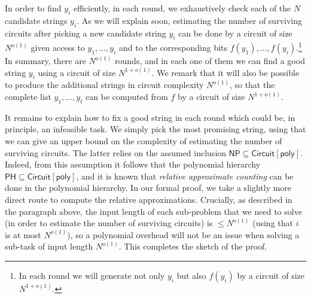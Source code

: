 \documentclass[11pt]{article}
\numberwithin{equation}{section}
\theoremstyle{definition}
\theoremstyle{plain}
\begin{document}
In order to find $y_i$ efficiently, in each round, we exhaustively check each of the $N$ candidate strings $y_i$. As we will explain soon, estimating the number of surviving circuits after picking a new candidate string $y_i$ can be done by a circuit of size $N^{o(1)}$ given access to $y_1, \ldots, y_i$ and to the corresponding bits $f(y_1), \ldots, f(y_i)$.\footnote{ 
In each round we will generate not only $y_i$ but also $f(y_i)$ by a circuit of size $N^{1+o(1)}$.
} In summary, there are $N^{o(1)}$ rounds, and in each one of them we can find a good string $y_i$ using a circuit of size $N^{1 + o(1)}$. We remark that it will also be possible to produce the additional strings in circuit complexity $N^{o(1)}$, so that the complete list $y_1, \ldots, y_t$ can be computed from $f$ by a circuit of size $N^{1 + o(1)}$. 

It remains to explain how to fix a good string in each round which could be, in principle, an infeasible task. We simply pick the most promising string, using that we can %
give an upper bound on %
the complexity of estimating the number of surviving circuits. The latter relies on the assumed inclusion $\mathsf{NP} \subseteq \mathsf{Circuit}[\mathsf{poly}]$. Indeed, from this assumption it follows that the polynomial hierarchy $\mathsf{PH} \subseteq \mathsf{Circuit}[\mathsf{poly}]$, and it is known that \emph{relative approximate counting} can be done in the polynomial hierarchy. In our formal proof, we take a slightly more direct route to compute the relative approximations. Crucially, as described in the paragraph above, the input length of each sub-problem that we need to solve (in order to estimate the number of surviving circuits) is $\leq N^{o(1)}$ (using that $i$ is at most $N^{o(1)}$), so a polynomial overhead will not be an issue when solving a sub-task of input length $N^{o(1)}$. This completes the sketch of the proof.\\
\end{document}
